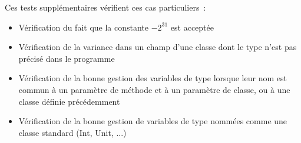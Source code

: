 \documentclass[a4paper,10pt]{article}
\newcommand{\code}[1]{{\fontfamily{pcr}\selectfont #1}}
\begin{document}
Ces tests supplémentaires vérifient ces cas particuliers~:
\begin{itemize}
\item{Vérification du fait que la constante $-2^{31}$ est acceptée}
\item{Vérification de la variance dans un champ d'une classe dont le
    type n'est pas précisé dans le programme}
\item{Vérification de la bonne gestion des variables de type lorsque
    leur nom est commun à un paramètre de méthode et à un paramètre de
  classe, ou à une classe définie précédemment}
\item{Vérification de la bonne gestion de variables de type nommées
    comme une classe standard (\code{Int}, \code{Unit}, ...)}
\end{itemize}
\end{document}
